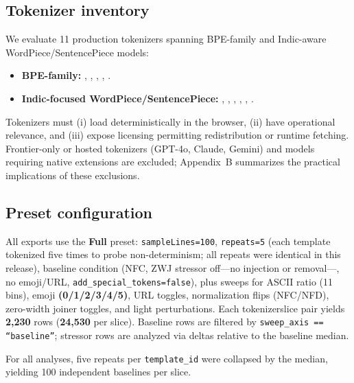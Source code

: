 \documentclass{article}
\begin{document}
\subsection{Tokenizer inventory}
We evaluate 11 production tokenizers spanning BPE-family and Indic-aware WordPiece/SentencePiece models:
\begin{sloppypar}
\begin{itemize}
    \item \textbf{BPE-family:} , , , , .
    \item \textbf{Indic-focused WordPiece/SentencePiece:} , , , , , .
\end{itemize}
\end{sloppypar}
Tokenizers must (i) load deterministically in the browser, (ii) have operational relevance, and (iii) expose licensing permitting redistribution or runtime fetching. Frontier-only or hosted tokenizers (GPT-4o, Claude, Gemini) and models requiring native extensions are excluded; Appendix~B summarizes the practical implications of these exclusions.

\subsection{Preset configuration}
All exports use the \textbf{Full} preset: \texttt{sampleLines=100}, \texttt{repeats=5} (each template tokenized five times to probe non-determinism; all repeats were identical in this release), baseline condition (NFC, ZWJ stressor off—no injection or removal—, no emoji/URL, \texttt{add\_special\_tokens=false}), plus sweeps for ASCII ratio (11 bins), emoji \textbf{(0/1/2/3/4/5)}, URL toggles, normalization flips (NFC/NFD), zero-width joiner toggles, and light perturbations. Each tokenizer\textendash{}slice pair yields \textbf{2,230} rows (\textbf{24,530} per slice). Baseline rows are filtered by \texttt{sweep\_axis == ``baseline''}; stressor rows are analyzed via deltas relative to the baseline median.

For all analyses, five repeats per \texttt{template\_id} were collapsed by the median, yielding 100 independent baselines per slice.
\end{document}
